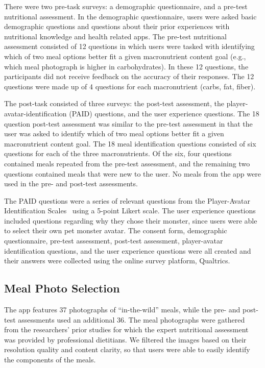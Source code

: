 There were two pre-task surveys: a demographic questionnaire, and a pre-test nutritional assessment.
In the demographic questionnaire, users were asked basic demographic questions and questions about their prior experiences with nutritional knowledge and health related apps. The pre-test nutritional assessment consisted of 12 questions in which users were tasked with identifying which of two meal options better fit a given macronutrient content goal (e.g., which meal photograph is higher in carbohydrates). 
In these 12 questions, the participants did not receive feedback on the accuracy of their responses. 
The 12 questions were made up of 4 questions for each macronutrient (carbs, fat, fiber). 

The post-task consisted of three surveys: the post-test assessment, the player-avatar-identification (PAID) questions, and the user experience questions.
The 18 question post-test assessment was similar to the pre-test assessment in that the user was asked to identify which of two meal options better fit a given macronutrient content goal.
The 18 meal identification questions consisted of six questions for each of the three macronutrients. Of the six, four questions contained meals repeated from the pre-test assessment, and the remaining two questions contained meals that were new to the user. No meals from the app were used in the pre- and post-test assessments.

The PAID questions were a series of relevant questions from the Player-Avatar Identification Scales~\cite{li2013player} using a 5-point Likert scale. 
The user experience questions included questions regarding why they chose their monster, since users were able to select their own pet monster avatar. The consent form, demographic questionnaire, pre-test assessment, post-test assessment, player-avatar identification questions, and the user experience questions were all created and their answers were collected using the online survey platform, Qualtrics.


\subsection{Meal Photo Selection}
The app features 37 photographs of ``in-the-wild'' meals, while the pre- and post-test assessments used an additional 36.
The meal photographs were gathered from the researchers' prior studies
for which the expert nutritional assessment was provided by professional dietitians. We filtered the images based on their resolution quality and content clarity, so that users were able to easily identify the components of the meals.

